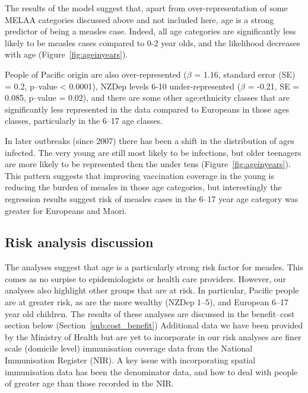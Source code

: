 \documentclass{article}
\begin{document}
The results of the model suggest that, apart from over-representation of some MELAA categories discussed above and not included here, age is a strong predictor of being a measles case. Indeed, all age categories are significantly less likely to be measles cases compared to 0-2 year olds, and the likelihood decreases with age (Figure~\ref{fig:ageinyears}).

People of Pacific origin are also over-represented ($\beta$ = 1.16, standard error (SE) = 0.2, p--value < 0.0001), NZDep levels 6-10 under-represented ($\beta$ = -0.21, SE = 0.085, p--value = 0.02), and there are some other age:ethnicity classes that are significantly less represented in the data compared to Europeans in those ages classes, particularly in the 6--17 age classes.

In later outbreaks (since 2007) there has been a shift in the distribution of ages infected. The very young are still most likely to be infections, but older teenagers are more likely to be represented then the under tens (Figure~\ref{fig:ageinyears}). This pattern suggests that improving vaccination coverage in the young is reducing the burden of measles in those age categories, but interestingly the regression results suggest risk of measles cases in the 6--17 year age category was greater for Europeans and Maori.

\subsection{Risk analysis discussion}

The analyses suggest that age is a particularly strong risk factor for measles. This comes as no surpise to epidemiologists or health care providers. However, our analyses also highlight other groups that are at risk. In particular, Pacific people are at greater risk, as are the more wealthy (NZDep 1--5), and European 6--17 year old children. The results of these analyses are discussed in the benefit--cost section below (Section~\ref{sub:cost_benefit}) Additional data we have been provided by the Ministry of Health but are yet to incorporate in our risk analyses are finer scale (domicile level) immunisation coverage data from the National Immunisation Register (NIR). A key issue with incorporating spatial immunisation data has been the denominator data, and how to deal with people of greater age than those recorded in the NIR.
\end{document}
